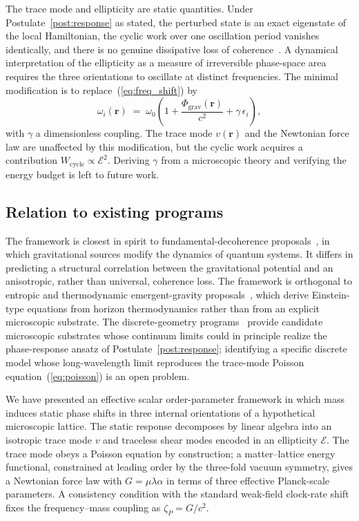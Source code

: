 \documentclass[pdflatex,sn-mathphys-num]{sn-jnl}%
\theoremstyle{thmstyleone}%
\theoremstyle{thmstyletwo}%
\theoremstyle{thmstylethree}%
\begin{document}
The trace mode and ellipticity are static quantities. Under
Postulate~\ref{post:response} as stated, the perturbed state
is an exact eigenstate of the local Hamiltonian, the
cyclic work over one oscillation period vanishes identically,
and there is no genuine dissipative loss of
coherence~\cite{BreuerPetruccione2002}. A dynamical
interpretation of the ellipticity as a measure of irreversible
phase-space area requires the three orientations to oscillate
at distinct frequencies. The minimal modification is to
replace~(\ref{eq:freq_shift}) by
\begin{equation}
    \omega_i(\mathbf{r})
    \;=\;
    \omega_0\!\left(1+\frac{\Phi_{\mathrm{grav}}(\mathbf{r})}{c^2}
    +\gamma\,\epsilon_i\right),
    \label{eq:freq_split}
\end{equation}
with $\gamma$ a dimensionless coupling. The trace mode $v(\mathbf{r})$ and the
Newtonian force law are unaffected by this modification, but
the cyclic work acquires a contribution
$W_{\mathrm{cycle}}\propto\mathcal{E}^2$. Deriving $\gamma$
from a microscopic theory and verifying the energy budget is
left to future work.

\subsection{Relation to existing programs}

The framework is closest in spirit to fundamental-decoherence
proposals~\cite{Diosi1989,Penrose1996,
BassiGrossardtUlbricht2017}, in which gravitational sources
modify the dynamics of quantum systems. It differs in
predicting a structural correlation between the gravitational
potential and an anisotropic, rather than universal, coherence
loss. The framework is orthogonal to entropic and
thermodynamic emergent-gravity
proposals~\cite{Jacobson1995,Verlinde2011,Padmanabhan2010},
which derive Einstein-type equations from horizon
thermodynamics rather than from an explicit microscopic
substrate. The discrete-geometry
programs~\cite{Rovelli2004,AshtekarLewandowski2004,AJL2012,
Sorkin1991,Oriti2012} provide candidate microscopic
substrates whose continuum limits could in principle realize
the phase-response ansatz of
Postulate~\ref{post:response}; identifying a specific
discrete model whose long-wavelength limit reproduces the
trace-mode Poisson equation~(\ref{eq:poisson}) is an open
problem.


\label{sec:conclusions}

We have presented an effective scalar order-parameter framework
in which mass induces static phase shifts in three internal
orientations of a hypothetical microscopic lattice. The static
response decomposes by linear algebra into an isotropic trace
mode $v$ and traceless shear modes encoded
in an ellipticity $\mathcal{E}$. The trace mode obeys a Poisson
equation by construction; a matter--lattice energy functional,
constrained at leading order by the three-fold vacuum symmetry,
gives a Newtonian force law with $G=\mu\lambda\alpha$ in terms
of three effective Planck-scale parameters. A consistency condition with
the standard weak-field clock-rate shift fixes the
frequency--mass coupling as $\zeta_P=G/c^2$.
\end{document}
